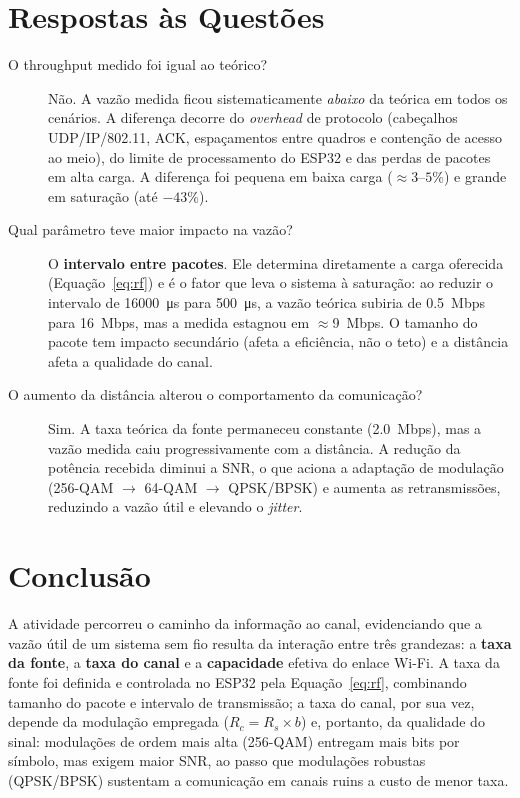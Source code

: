 \documentclass[
  12pt,
  a4paper,
  oneside,
  brazil,
  chapter=TITLE,
  section=TITLE,
]{abntex2}
\begin{document}
\chapter{Respostas às Questões}

\begin{description}
  \item[O throughput medido foi igual ao teórico?] Não. A vazão medida ficou
    sistematicamente \emph{abaixo} da teórica em todos os cenários. A diferença
    decorre do \textit{overhead} de protocolo (cabeçalhos UDP/IP/802.11, ACK,
    espaçamentos entre quadros e contenção de acesso ao meio), do limite de
    processamento do ESP32 e das perdas de pacotes em alta carga. A diferença
    foi pequena em baixa carga ($\approx 3$--$5\%$) e grande em saturação (até
    $-43\%$).

  \item[Qual parâmetro teve maior impacto na vazão?] O \textbf{intervalo entre
    pacotes}. Ele determina diretamente a carga oferecida
    (Equação~\ref{eq:rf}) e é o fator que leva o sistema à saturação: ao
    reduzir o intervalo de \SI{16000}{\micro\second} para
    \SI{500}{\micro\second}, a vazão
    teórica subiria de \SI{0.5}{Mbps} para \SI{16}{Mbps}, mas a medida estagnou em
    $\approx$\SI{9}{Mbps}. O tamanho do pacote tem impacto secundário (afeta a
    eficiência, não o teto) e a distância afeta a qualidade do canal.

  \item[O aumento da distância alterou o comportamento da comunicação?] Sim. A
    taxa teórica da fonte permaneceu constante (\SI{2.0}{Mbps}), mas a vazão
    medida caiu progressivamente com a distância. A redução da potência recebida
    diminui a SNR, o que aciona a adaptação de modulação (256-QAM
    $\rightarrow$ 64-QAM $\rightarrow$ QPSK/BPSK) e aumenta as retransmissões,
    reduzindo a vazão útil e elevando o \textit{jitter}.
\end{description}

\chapter{Conclusão}

A atividade percorreu o caminho da informação ao canal, evidenciando que a
vazão útil de um sistema sem fio resulta da interação entre três grandezas: a
\textbf{taxa da fonte}, a \textbf{taxa do canal} e a \textbf{capacidade}
efetiva do enlace Wi-Fi. A taxa da fonte foi definida e controlada no ESP32 pela
Equação~\ref{eq:rf}, combinando tamanho do pacote e intervalo de transmissão; a
taxa do canal, por sua vez, depende da modulação empregada
($R_c = R_s \times b$) e, portanto, da qualidade do sinal: modulações de ordem
mais alta (256-QAM) entregam mais bits por símbolo, mas exigem maior SNR, ao
passo que modulações robustas (QPSK/BPSK) sustentam a comunicação em canais
ruins a custo de menor taxa.
\end{document}
